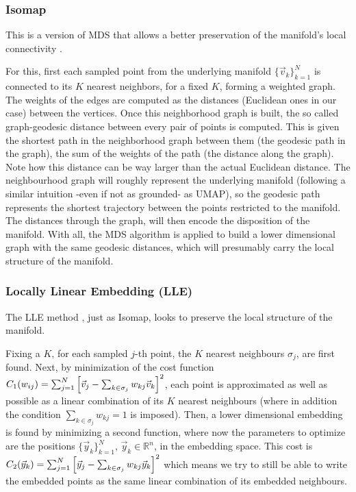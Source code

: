 \documentclass[11pt, a4paper, twoside]{article} %
\newcommand{\R}{\mathbb{R}} %
\DeclareRobustCommand{\mybox}[2][gray!10]{%
\begin{tcolorbox}[   %
        left=0.2cm,
        right=0.2cm,
        top=0.15cm,
        bottom=0.15cm,
        colback=#1,
        colframe=#1,
        width=\dimexpr\textwidth\relax, 
        enlarge left by=0mm,
        boxsep=5pt,
        arc=0pt,outer arc=0pt,
        ]
        #2
\end{tcolorbox}
}
\begin{document}
\subsubsection*{Isomap}
This is a version of MDS that allows a better preservation of the manifold's local connectivity \cite{isomap}. 

\mybox{For this, first each sampled point from the underlying manifold $\{\vec{v}_k\}_{k=1}^N$ is connected to its $K$ nearest neighbors, for a fixed $K$, forming a weighted graph. The weights of the edges are computed as the distances (Euclidean ones in our case) between the vertices. Once this neighborhood graph is built, the so called graph-geodesic distance between every pair of points is computed. This is given the shortest path in the neighborhood graph between them (the geodesic path in the graph), the sum of the weights of the path (the distance along the graph). Note how this distance can be way larger than the actual Euclidean distance. The neighbourhood graph will roughly represent the underlying manifold (following a similar intuition -even if not as grounded- as UMAP), so the geodesic path represents the shortest trajectory between the points restricted to the manifold. The distances through the graph, will then encode the disposition of the manifold. With all, the MDS algorithm is applied to build a lower dimensional graph with the same geodesic distances, which will presumably carry the local structure of the manifold. %
}

\subsubsection*{Locally Linear Embedding (LLE)}
The LLE method \cite{LLE}, just as Isomap, looks to preserve the local structure of the manifold.

\mybox{ Fixing a $K$, for each sampled $j$-th point, the $K$ nearest neighbours $\sigma_j$, are first found. Next, by minimization of the cost function $C_1(w_{ij})=\sum_{j=1}^N \qty[\vec{v}_j-\sum_{k\in\sigma_j}w_{kj}\vec{v}_k]^2$, each point is approximated as well as possible as a linear combination of its $K$ nearest neighbours (where in addition the condition $\sum_{k\in\sigma_j}w_{kj}=1$ is imposed). Then, a lower dimensional embedding is found by minimizing a second function, where now the parameters to optimize are the positions $\{\vec{y}_k\}_{k=1}^N$, $\vec{y}_k\in\R^n$, in the embedding space. This cost is $C_2(\vec{y}_k)=\sum_{j=1}^N \qty[\vec{y}_j-\sum_{k\in\sigma_j}w_{kj}\vec{y}_k]^2$ which means we try to still be able to write the embedded points as the same linear combination of its embedded neighbours.}
 
\end{document}
